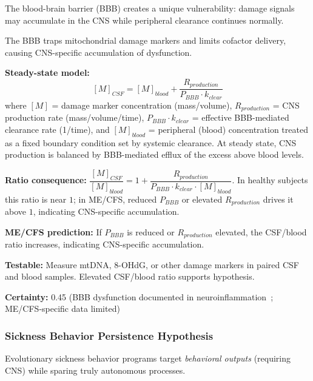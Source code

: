 The blood-brain barrier (BBB) creates a unique vulnerability: damage signals may accumulate in the CNS while peripheral clearance continues normally.

\begin{hypothesis}
\label{hyp:bbb-vulnerability}
The BBB traps mitochondrial damage markers and limits cofactor delivery, causing CNS-specific accumulation of dysfunction.

\textbf{Steady-state model:}
\[
[M]_{CSF} = [M]_{blood} + \frac{R_{production}}{P_{BBB} \cdot k_{clear}}
\]
where $[M]$ = damage marker concentration (mass/volume), $R_{production}$ = CNS production rate (mass/volume/time), $P_{BBB} \cdot k_{clear}$ = effective BBB-mediated clearance rate (1/time), and $[M]_{blood}$ = peripheral (blood) concentration treated as a fixed boundary condition set by systemic clearance. At steady state, CNS production is balanced by BBB-mediated efflux of the excess above blood levels.

\textbf{Ratio consequence:} $\dfrac{[M]_{CSF}}{[M]_{blood}} = 1 + \dfrac{R_{production}}{P_{BBB} \cdot k_{clear} \cdot [M]_{blood}}$. In healthy subjects this ratio is near $1$; in ME/CFS, reduced $P_{BBB}$ or elevated $R_{production}$ drives it above $1$, indicating CNS-specific accumulation.

\textbf{ME/CFS prediction:} If $P_{BBB}$ is reduced or $R_{production}$ elevated, the CSF/blood ratio increases, indicating CNS-specific accumulation.

\textbf{Testable:} Measure mtDNA, 8-OHdG, or other damage markers in paired CSF and blood samples. Elevated CSF/blood ratio supports hypothesis.

\textbf{Certainty:} 0.45 (BBB dysfunction documented in neuroinflammation~\cite{Nakatomi2014neuroinflammation}; ME/CFS-specific data limited)
\end{hypothesis}


\subsubsection{Sickness Behavior Persistence Hypothesis}

Evolutionary sickness behavior programs target \emph{behavioral outputs} (requiring CNS) while sparing truly autonomous processes.

